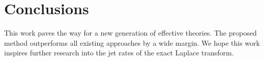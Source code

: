\section{Conclusions}\label{sec:conclusions}

This work paves the way for a new generation of effective theories. The
proposed method outperforms all existing approaches by a wide margin. We
hope this work inspires further research into the jet rates of the exact
Laplace transform.

